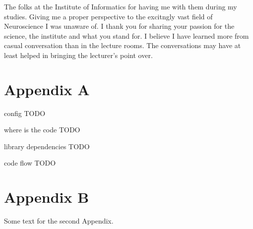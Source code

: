 \documentclass{report}
\begin{document}
The folks at the Institute of Informatics for having me with them during my studies. Giving me a proper perspective to the excitngly vast field of Neuroscience I was unaware of. I thank you for sharing your passion for the science, the institute and what you stand for. I believe I have learned more from casual conversation than in the lecture rooms. The conversations may have at least helped in bringing the lecturer's point over.

\appendix

\chapter{Appendix A}

config TODO

where is the code TODO

library dependencies TODO

code flow TODO

\chapter{Appendix B}

Some text for the second Appendix.



\end{document}
